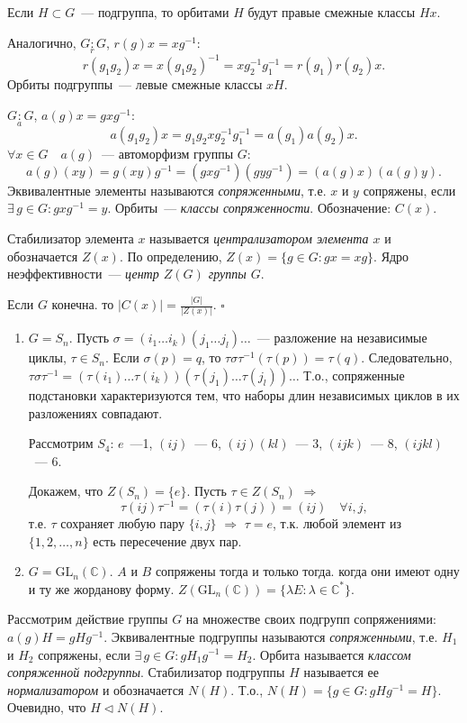 \documentclass[a4paper]{article}
\begin{document}
Если $H\subset G$~--- подгруппа, то орбитами $H$ будут правые
смежные классы $Hx$.

Аналогично, $G\mathop{:}\limits_r G$, $r(g)x=xg^{-1}$:
$$r(g_1g_2)x=x(g_1g_2)^{-1}=xg_2^{-1}g_1^{-1}=r(g_1)r(g_2)x.$$ Орбиты
подгруппы~--- левые смежные классы $xH$.

$G\mathop{:}\limits_a G$, $a(g)x=gxg^{-1}$:
$$a(g_1g_2)x=g_1g_2xg_2^{-1}g_1^{-1}=a(g_1)a(g_2)x.$$ $\forall x\in G
\quad a(g)$~--- автоморфизм группы $G$:
$$a(g)(xy)=g(xy)g^{-1}=(gxg^{-1})(gyg^{-1})=(a(g)x)(a(g)y).$$
Эквивалентные элементы называются \emph{сопряженными}, т.е. $x$ и
$y$ сопряжены, если $\exists \, g\in G: gxg^{-1}=y$. Орбиты~---
\emph{классы сопряженности}. Обозначение: $C(x)$.

Стабилизатор элемента $x$ называется \emph{централизатором элемента
$x$} и обозначается $Z(x)$. По определению, $Z(x)=\{g\in G:
gx=xg\}$. Ядро неэффективности~--- \emph{центр $Z(G)$ группы $G$}.

\begin{sled}
Если $G$ конечна. то $|C(x)|=\frac{|G|}{|Z(x)|}$. $\square$
\end{sled}

\prim
\begin{enumerate}
  \item $G=S_n$. Пусть $\sigma=(i_1\ldots
  i_k)(j_1\ldots j_l)\ldots$~--- разложение на независимые циклы, $\tau\in
  S_n$. Если $\sigma(p)=q$, то $\tau\sigma\tau^{-1}(\tau
  (p))=\tau(q)$. Следовательно, $\tau\sigma\tau^{-1}=(\tau(i_1)\ldots\tau(i_k))
  (\tau(j_1)\ldots\tau(j_l))\ldots$ Т.о., сопряженные подстановки
  характеризуются тем, что наборы длин независимых циклов в их
  разложениях совпадают.

  Рассмотрим $S_4$: $e$~---1, $(ij)$~--- 6, $(ij)(kl)$~--- 3,
  $(ijk)$~--- 8, $(ijkl)$~--- 6.

  Докажем, что $Z(S_n)=\{e\}$. Пусть $\tau\in Z(S_n)$ $\Rightarrow$
  $$\tau(ij)\tau^{-1}=(\tau(i)\tau(j))=(ij)\quad \forall i,j,$$ т.е.
  $\tau$ сохраняет любую пару $\{i,j\}$ $\Rightarrow$ $\tau=e$, т.к.
  любой элемент из $\{1,2,\ldots,n\}$ есть пересечение двух пар.
  \item $G=\mathrm{GL}_n(\mathbb{C})$. $A$ и $B$ сопряжены тогда и только
  тогда. когда они имеют одну и ту же жорданову форму. $Z(\mathrm{GL}_n(\mathbb{C}))=\{\lambda E:\lambda\in
  \mathbb{C}^*\}$.
\end{enumerate}

Рассмотрим действие группы $G$ на множестве своих подгрупп
сопряжениями: $a(g)H=gHg^{-1}$. Эквивалентные подгруппы называются
\emph{сопряженными}, т.е. $H_1$ и $H_2$ сопряжены, если $\exists \,
g\in G: gH_1g^{-1}=H_2$. Орбита называется \emph{классом сопряженной
подгруппы}. Стабилизатор подгруппы $H$ называется ее
\emph{нормализатором} и обозначается $N(H)$. Т.о., $N(H)=\{g\in G:
gHg^{-1}=H\}$. Очевидно, что $H\triangleleft N(H)$.
\end{document}
